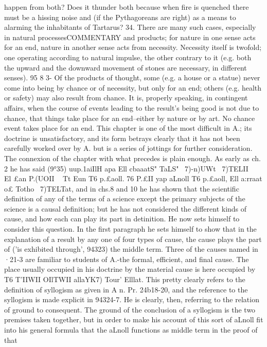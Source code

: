 {{{{{{{{{{{{{{{{{{{{{{{{{{{{{{{{{{{{{{{{{{{{{{{{{{{{{{{{{happen from both? Does it thunder both because when fire is
quenched there must be a hissing noise and (if the Pythagoreans
are right) as a means to alarming the inhabitants of Tartarus?
34. There are many such cases, especially in natural processesCOMMENTARY
and products; for nature in one sense acts for an end, nature in
another sense acts from necessity. Necessity itself is twofold;
one operating according to natural impulse, the other contrary to
it (e.g. both the upward and the downward movement of stones
are necessary, in different senses).
95 8 3- Of the products of thought, some (e.g. a house or a statue)
never come into being by chance or of necessity, but only for
an end; others (e.g. health or safety) may also result from chance.
It is, properly speaking, in contingent affairs, when the course of
events leading to the result's being good is not due to chance,
that things take place for an end--either by nature or by art.
No chance event takes place for an end.
This chapter is one of the most difficult in A.; its doctrine is
unsatisfactory, and its form betrays clearly that it has not been
carefully worked over by A. but is a series of jottings for further
consideration. The connexion of the chapter with what precedes
is plain enough. As early as ch. 2 he has said (9°35) uup.{1aiIlH apa
Ell cbaaatS" TaLS" ~7)-n)UWt ~7)TELII ~ El £an P.(UOII ~ Tt Eun T6 p.£aoll.
76 P.£II yap aLnoll T6 p.£aoll, Ell a:rraat o£ Totho ~7)TELTat, and in
chs.8 and 10 he has shown that the scientific definition of any of
the terms of a science except the primary subjects of the science
is a causal definition; but he has not considered the different
kinds of cause, and how each can play its part in detinition. He
now sets himself to consider this question. In the first paragraph
he sets himself to show that in the explanation of a result by any
one of four types of cause, the cause plays the part of ('is exhibited
through', 94323) the middle term. Three of the causes named in
·21-3 are familiar to students of A.-the formal, efficient, and
final cause. The place usually occupied in his doctrine by the
material cause is here occupied by T6 T'IIWII OIlTWII allaYK7) Tour'
Elllat. This pretty clearly refers to the definition of syllogism as
given in A n. Pr. 24b18-20, and the reference to the syllogism is
made explicit in 94324-7. He is clearly, then, referring to the
relation of ground to consequent. The ground of the conclusion
of a syllogism is the two premises taken together, but in order to
make his account of this sort of aLnoll fit into his general formula
that the aLnoll functions as middle term in the proof of that
}}}}}}}}}}}}}}}}}}}}}}}}}}}}}}}}}}}}}}}}}}}}}}}}}}}}}}}}}}
